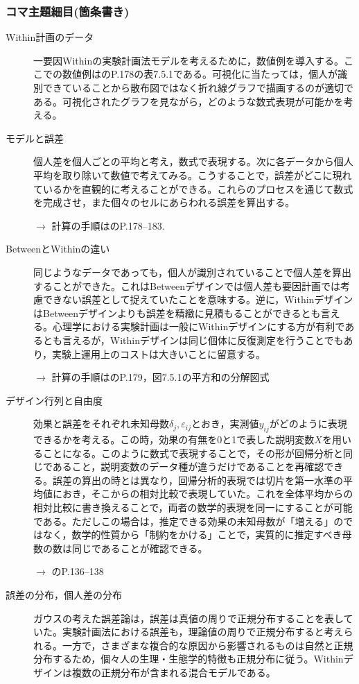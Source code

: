 \subsubsection{コマ主題細目(箇条書き)}
\begin{description}
	\item[Within計画のデータ] 一要因Withinの実験計画法モデルを考えるために，数値例を導入する。ここでの数値例は\citet{Yamada2004}のP.178の表7.5.1である。可視化に当たっては，個人が識別できていることから散布図ではなく折れ線グラフで描画するのが適切である。可視化されたグラフを見ながら，どのような数式表現が可能かを考える。

	\item[モデルと誤差] 個人差を個人ごとの平均と考え，数式で表現する。次に各データから個人平均を取り除いて数値で考えてみる。こうすることで，誤差がどこに現れているかを直観的に考えることができる。これらのプロセスを通じて数式を完成させ，また個々のセルにあらわれる誤差を算出する。
	      \begin{flushright}
		      $\to$ 計算の手順は\citet{Yamada2004}のP.178--183.
	      \end{flushright}

	\item[BetweenとWithinの違い] 同じようなデータであっても，個人が識別されていることで個人差を算出することができた。これはBetweenデザインでは個人差も要因計画では考慮できない誤差として捉えていたことを意味する。逆に，WithinデザインはBetweenデザインよりも誤差を精緻に見積もることができるとも言える。心理学における実験計画は一般にWithinデザインにする方が有利であるとも言えるが，Withinデザインは同じ個体に反復測定を行うことでもあり，実験上運用上のコストは大きいことに留意する。
	      \begin{flushright}
		      $\to$ 計算の手順は\citet{Yamada2004}のP.179，図7.5.1の平方和の分解図式
	      \end{flushright}

	\item[デザイン行列と自由度] 効果と誤差をそれぞれ未知母数$\delta_j,\varepsilon_{ij}$とおき，実測値${y_{ij}}$がどのように表現できるかを考える。この時，効果の有無を0と1で表した説明変数$X$を用いることになる。このように数式で表現することで，その形が回帰分析と同じであること，説明変数のデータ種が違うだけであることを再確認できる。誤差の算出の時とは異なり，回帰分析的表現では切片を第一水準の平均値におき，そこからの相対比較で表現していた。これを全体平均からの相対比較に書き換えることで，両者の数学的表現を同一にすることが可能である。ただしこの場合は，推定できる効果の未知母数が「増える」のではなく，数学的性質から「制約をかける」ことで，実質的に推定すべき母数の数は同じであることが確認できる。
	      \begin{flushright}
		      $\to$ \citet{kosugi2018}のP.136--138
	      \end{flushright}
	\item[誤差の分布，個人差の分布] ガウスの考えた誤差論は，誤差は真値の周りで正規分布することを表していた。実験計画法における誤差も，理論値の周りで正規分布すると考えられる。一方で，さまざまな複合的な原因から影響されるものは自然と正規分布するため，個々人の生理・生態学的特徴も正規分布に従う。Withinデザインは複数の正規分布が含まれる混合モデルである。

\end{description}
